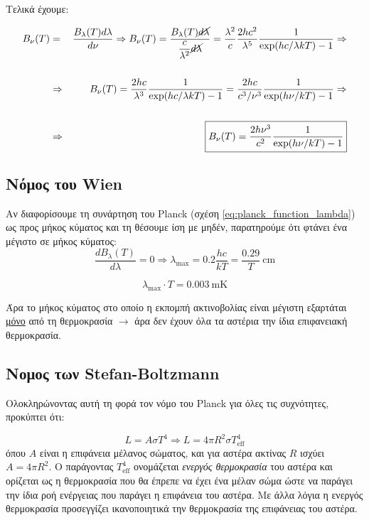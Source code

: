 Τελικά έχουμε:

\begin{eqnarray}
\label{eq:planck_function_frequency}
    B_{\nu}(T) &=& \frac{B_{\lambda}(T) d \lambda}{d\nu} \Rightarrow B_{\nu}(T) = \frac{B_{\lambda}(T) \cancel{d\lambda}}{\displaystyle  \frac{c}{\lambda^2} \cancel{d \lambda}} =  \frac{\lambda^2}{c} \frac{2hc^2}{\lambda^5} \frac{1}{\exp(hc / \lambda kT) - 1} \Rightarrow \nonumber \\ \nonumber \\
    &\Rightarrow & B_{\nu}(T) =  \frac{2hc}{\lambda^3} \frac{1}{\exp(hc / \lambda kT) - 1} =  \frac{2hc}{c^3 / \nu^3} \frac{1}{\exp(h \nu / kT) - 1} \Rightarrow \nonumber \\ \nonumber \\
    &\Rightarrow & \boxed{B_{\nu}(T) =  \frac{2h \nu^3}{c^2} \frac{1}{\exp(h \nu / kT) - 1}}
\end{eqnarray}


\subsection{Νόμος του Wien}
Αν διαφορίσουμε τη συνάρτηση του Planck (σχέση \eqref{eq:planck_function_lambda}) ως προς μήκος κύματος και τη θέσουμε ίση με μηδέν, παρατηρούμε ότι φτάνει ένα μέγιστο σε μήκος κύματος:
$$\frac{d B_{\lambda}(T)}{d \lambda} = 0 \Rightarrow \lambda_{\text{max}} = 0.2 \frac{hc}{kT} = \frac{0.29}{T} \ \text{cm}$$

\begin{equation}
    \boxed{\lambda_{\text{max}} \cdot T = 0.003 \ \text{mK}}
\end{equation}

Άρα το μήκος κύματος στο οποίο η εκπομπή ακτινοβολίας είναι μέγιστη εξαρτάται \underline{μόνο} από τη θερμοκρασία $\longrightarrow$ άρα δεν έχουν όλα τα αστέρια την ίδια επιφανειακή θερμοκρασία.

\subsection{Νομος των Stefan-Boltzmann}
Ολοκληρώνοντας αυτή τη φορά τον νόμο του Planck για όλες τις συχνότητες, προκύπτει ότι:

\begin{equation}
    \label{eq:stefan_boltzmann}
    L = A \sigma T^4 \Rightarrow \boxed{L = 4 \pi R^2 \sigma T_{\text{eff}}^4}
\end{equation}
όπου $A$ είναι η επιφάνεια μέλανος σώματος, και για αστέρα ακτίνας $R$ ισχύει $A=4\pi R^2$. Ο παράγοντας $T_{\text{eff}}^4$ ονομάζεται \textit{ενεργός θερμοκρασία} του αστέρα και ορίζεται ως η θερμοκρασία που θα έπρεπε να έχει ένα μέλαν σώμα ώστε να παράγει την ίδια ροή ενέργειας που παράγει η επιφάνεια του αστέρα. Με άλλα λόγια η ενεργός θερμοκρασία προσεγγίζει ικανοποιητικά την θερμοκρασία της επιφάνειας του αστέρα.

